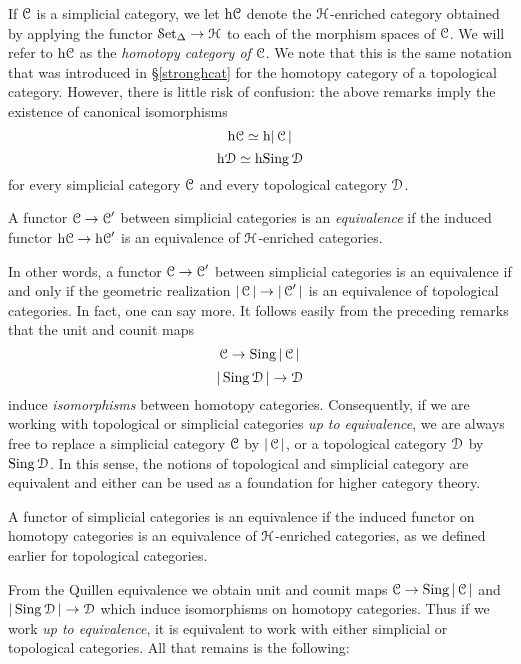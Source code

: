 If $\operatorname{\mathcal{C}}$ is a simplicial category, we let $\rm{h} \it{\operatorname{\mathcal{C}}}$ denote the $\operatorname{\mathcal{H}}$-enriched category obtained by  applying the functor $\operatorname{\mathcal{S}et_{\Delta}} \rightarrow \operatorname{\mathcal{H}}$ to each of the morphism spaces of $\operatorname{\mathcal{C}}$. We will refer to $\rm{h} \it{ \operatorname{\mathcal{C}}}$ as the {\it homotopy category of $\operatorname{\mathcal{C}}$}. We note that this is the same notation that was introduced in \S \ref{stronghcat} for the homotopy category of a topological category. However, there is little risk of confusion: the above remarks imply the existence of canonical isomorphisms
$$ \rm{h} \it{\operatorname{\mathcal{C}}} \simeq \rm{h} \it{ |\operatorname{\mathcal{C}}|}$$
$$ \rm{h} \it{\operatorname{\mathcal{D}}} \simeq \rm{h} \it{ \operatorname{Sing}\operatorname{\mathcal{D}}}$$
for every simplicial category $\operatorname{\mathcal{C}}$ and every topological category $\operatorname{\mathcal{D}}$.

\begin{definition}
A functor $\operatorname{\mathcal{C}} \rightarrow \operatorname{\mathcal{C}}'$ between simplicial categories is an {\it equivalence} if
the induced functor $\rm{h} \it{ \operatorname{\mathcal{C}}} \rightarrow \rm{h} \it{ \operatorname{\mathcal{C}}'}$ is an equivalence of $\operatorname{\mathcal{H}}$-enriched categories.
\end{definition}

In other words, a functor $\operatorname{\mathcal{C}} \rightarrow \operatorname{\mathcal{C}}'$ between simplicial categories is an equivalence if and only if the geometric realization $|\operatorname{\mathcal{C}}| \rightarrow |\operatorname{\mathcal{C}}'|$ is an equivalence of topological categories. In fact, one can say more. It follows easily from the preceding remarks that the unit and counit maps
$$ \operatorname{\mathcal{C}} \rightarrow \operatorname{Sing} | \operatorname{\mathcal{C}} |$$
$$ | \operatorname{Sing} \operatorname{\mathcal{D}} | \rightarrow \operatorname{\mathcal{D}}$$
induce {\em isomorphisms} between homotopy categories. Consequently, if we are working with topological or simplicial categories {\it up to equivalence}, we are always free to replace a simplicial category $\operatorname{\mathcal{C}}$ by $|\operatorname{\mathcal{C}}|$, or a topological category $\operatorname{\mathcal{D}}$ by $\operatorname{Sing} \operatorname{\mathcal{D}}$. In this sense, the notions of topological and simplicial category are equivalent and either can be used as a foundation for higher category theory.
\begin{shaded}
A functor of simplicial categories is an equivalence if the induced functor on homotopy categories is an equivalence of $\operatorname{\mathcal{H}}$-enriched categories, as we defined earlier for topological categories.

From the Quillen equivalence \smash{$\Adjoint{}{\sSet}{\CG}{}$} we obtain unit and counit maps $ \operatorname{\mathcal{C}} \rightarrow \operatorname{Sing} | \operatorname{\mathcal{C}} |$ and $ | \operatorname{Sing} \operatorname{\mathcal{D}} | \rightarrow \operatorname{\mathcal{D}}$ which induce isomorphisms on homotopy categories. Thus if we work \textit{up to equivalence}, it is equivalent to work with either simplicial or topological categories. All that remains is the following:
\end{shaded}


